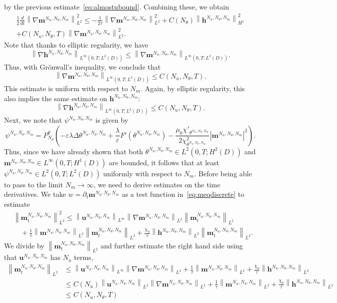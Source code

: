 \documentclass[10pt,letterpaper,twoside]{amsart}
\theoremstyle{definition}{\newtheorem{definition}[lemma]{Definition}}
\theoremstyle{note}{\newtheorem{claim}{Claim}[section]
\newtheorem*{claim*}{Claim}}
\numberwithin{equation}{section}
\newcommand{\dom}{D}
\newcommand{\norm}[1]{\left\| #1 \right\|}
\newcommand{\Grad}{\nabla}
\newcommand{\bma}{\mathbf{m}^{N_u,N_\theta,N_m}}
\newcommand{\bha}{\mathbf{h}^{N_u,N_\theta,N_m}}
\newcommand{\bua}{\mathbf{u}^{N_u,N_\theta,N_m}}
\newcommand{\tha}{\theta^{N_u,N_\theta,N_m}}
\begin{document}
by the previous estimate~\eqref{eq:almostubound}. Combining these, we obtain
\begin{multline*}
	\frac12\frac{d}{dt}\norm{\Grad \bma}_{L^2}^2 \leq  -\frac{1}{2\tau}\norm{\Grad\bma}_{L^2}^2 + C(N_\theta) \norm{\bha}_{H^1}^2 \\
	+C(N_u , N_\theta,T)\norm{\Grad\bma}_{L^2}^2.
\end{multline*}
Note that thanks to elliptic regularity, we have 
\begin{equation*}
	\norm{\Grad\bha}_{L^\infty(0,T;L^2(\dom))} \leq \norm{\Grad\bma}_{L^\infty(0,T;L^2(\dom))}. 
\end{equation*}
Thus, with Gr\"onwall's inequality, we conclude that
\begin{equation}\label{eq:mgradbound}	\norm{\Grad\bma}_{L^\infty(0,T;L^2(\dom))}\leq C(N_u , N_\theta,T).
\end{equation}
This estimate is uniform with respect to $N_m$.
Again, by elliptic regularity, this also implies the same estimate on $\bha$:
\begin{equation}\label{eq:hgradbound}
	\norm{\Grad\bha}_{L^\infty(0,T;L^2(\dom))}\leq C(N_u , N_\theta,T).
\end{equation}
Next, we note that $\psi^{N_u,N_\theta,N_m}$ is given by
\begin{equation}\label{eq:psiprojection}
	\psi^{N_u,N_\theta,N_m}= P^\theta_{N_\theta}\left(-\varepsilon\lambda\Delta \tha +\frac{\lambda}{\varepsilon}F'(\tha)-\frac{\mu_0\chi'_{\tha}}{2\chi_{\tha}^2}|\bma|^2\right).
\end{equation}
Thus, since we have already shown that both $\tha\in L^2(0,T;H^2(\dom))$ and $\bma\in L^\infty(0,T;H^1(\dom))$ are bounded, it follows that at least $\psi^{N_u,N_\theta,N_m}\in L^2(0,T;L^2(\dom))$ uniformly with respect to $N_m$.
Before being able to pass to the limit $N_m\to \infty$, we need to derive estimates on the time derivatives. We take $w=\partial_t \bma$ as a test function in~\eqref{eq:meqdiscrete} to estimate
\begin{align*}
	&\norm{\bma_t}^2_{L^2}\leq \norm{\bua}_{L^\infty}\norm{\Grad \bma}_{L^2}\norm{\bma_t}_{L^2}\\
	&\quad  + \frac1{\tau}\norm{\bma}_{L^2}\norm{\bma_t}_{L^2}+\frac{\chi_0}{\tau}\norm{\bha}_{L^2}\norm{\bma_t}_{L^2}.
\end{align*}
We divide by $\norm{\bma_t}_{L^2}$ and further estimate the right hand side using that $\bua$ has $N_u$ terms,
\begin{equation*}
	\begin{split}
	\norm{\bma_t}_{L^2}&\leq \norm{\bua}_{L^\infty}\norm{\Grad \bma}_{L^2} + \frac1{\tau}\norm{\bma}_{L^2}+\frac{\chi_0}{\tau}\norm{\bha}_{L^2}\\
	&\leq C(N_u)\norm{\bua}_{L^2}\norm{\Grad \bma}_{L^2} + \frac1{\tau}\norm{\bma}_{L^2}+\frac{\chi_0}{\tau}\norm{\bha}_{L^2}\\
	&\leq C(N_u,N_\theta,T)
\end{split}
\end{equation*}
\end{document}
